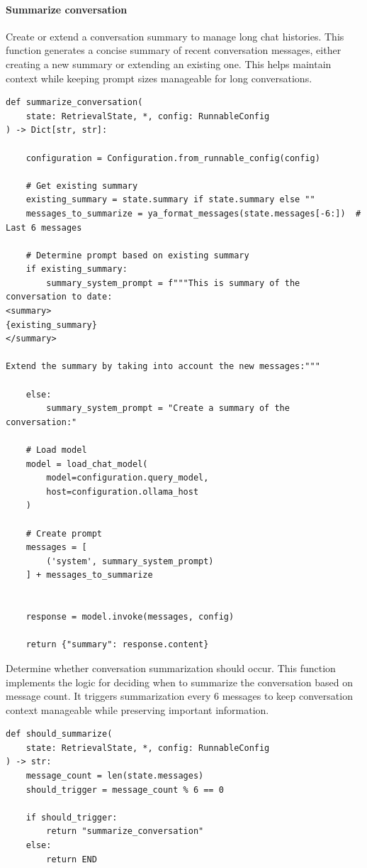 \documentclass[11pt,a4paper]{report}
\begin{document}
\paragraph{Summarize conversation}

Create or extend a conversation summary to manage long chat histories. This function generates a concise summary of recent conversation messages, either creating a new summary or extending an existing one. This helps maintain context while keeping prompt sizes manageable for long conversations.
    
\begin{lstlisting}[caption={Summarize conversation node}]
def summarize_conversation(
    state: RetrievalState, *, config: RunnableConfig
) -> Dict[str, str]:

    configuration = Configuration.from_runnable_config(config)
    
    # Get existing summary
    existing_summary = state.summary if state.summary else ""
    messages_to_summarize = ya_format_messages(state.messages[-6:])  # Last 6 messages
    
    # Determine prompt based on existing summary
    if existing_summary:
        summary_system_prompt = f"""This is summary of the conversation to date:
<summary>
{existing_summary}
</summary>

Extend the summary by taking into account the new messages:"""

    else:
        summary_system_prompt = "Create a summary of the conversation:"

    # Load model
    model = load_chat_model(
        model=configuration.query_model, 
        host=configuration.ollama_host
    )
    
    # Create prompt
    messages = [
        ('system', summary_system_prompt)
    ] + messages_to_summarize

    
    response = model.invoke(messages, config)

    return {"summary": response.content}
\end{lstlisting}

Determine whether conversation summarization should occur. This function implements the logic for deciding when to summarize the conversation based on message count. It triggers summarization every 6 messages to keep conversation context manageable while preserving important information.
    
\begin{lstlisting}[caption={Summarize conditional edge}]
def should_summarize(
    state: RetrievalState, *, config: RunnableConfig
) -> str:
    message_count = len(state.messages)
    should_trigger = message_count % 6 == 0

    if should_trigger:
        return "summarize_conversation"
    else:
        return END
\end{lstlisting}
\end{document}
